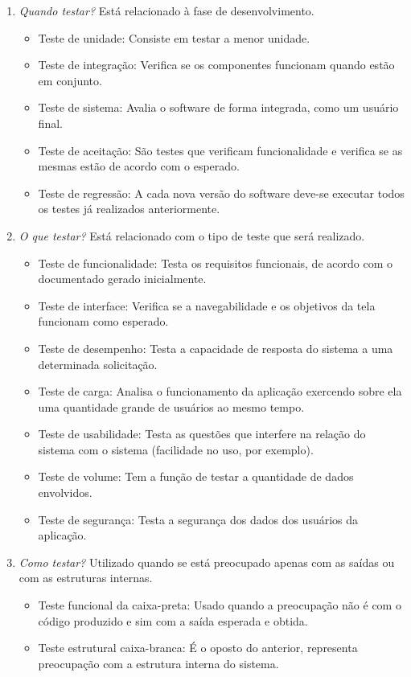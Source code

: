 \documentclass[runningheads]{llncs}
\begin{document}
\begin{enumerate}
    \item \textit{Quando testar?} Está relacionado à fase de desenvolvimento.
        \begin{itemize}
            \item {Teste de unidade}: Consiste em testar a menor unidade.
            \item {Teste de integração}: Verifica se os componentes funcionam quando estão em conjunto.
            \item {Teste de sistema}: Avalia o software de forma integrada, como um usuário final.
            \item {Teste de aceitação}: São testes que verificam funcionalidade e verifica se as mesmas estão de acordo com o esperado.
            \item {Teste de regressão}: A cada nova versão do software deve-se executar todos os testes já realizados anteriormente.
        \end{itemize}
    \item \textit{O que testar?} Está relacionado com o tipo de teste que será realizado.
        \begin{itemize}
            \item {Teste de funcionalidade}: Testa os requisitos funcionais, de acordo com o documentado gerado inicialmente.
            \item {Teste de interface}: Verifica se a navegabilidade e os objetivos da tela funcionam como esperado.
            \item {Teste de desempenho}: Testa a capacidade de resposta do sistema a uma determinada solicitação.
            \item {Teste de carga}: Analisa o funcionamento da aplicação exercendo sobre ela uma quantidade grande de usuários ao mesmo tempo.
            \item {Teste de usabilidade}: Testa as questões que interfere na relação do sistema com o sistema (facilidade no uso, por exemplo).
            \item {Teste de volume}: Tem a função de testar a quantidade de dados envolvidos.
            \item {Teste de segurança}: Testa a segurança dos dados dos usuários da aplicação.
        \end{itemize}
    \item \textit{Como testar?} Utilizado quando se está preocupado apenas com as saídas ou com as estruturas internas.
        \begin{itemize}
            \item {Teste funcional da caixa-preta}: Usado quando a preocupação não é com o código produzido e sim com a saída esperada e obtida.
            \item {Teste estrutural caixa-branca}: É o oposto do anterior, representa preocupação com a estrutura interna do sistema.
        \end{itemize}
\end{enumerate}
\end{document}

